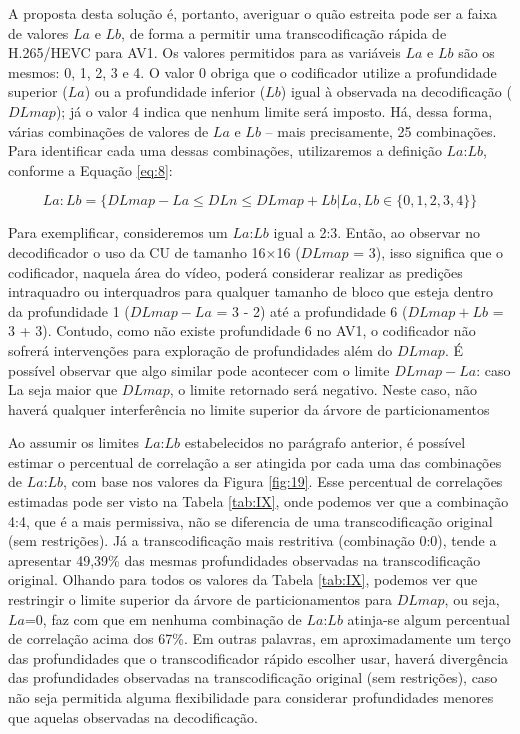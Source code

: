 A proposta desta solução é, portanto, averiguar o quão estreita pode ser a faixa de valores $La$ e $Lb$, de forma a permitir uma transcodificação rápida de H.265/HEVC para AV1. Os valores permitidos para as variáveis $La$ e $Lb$ são os mesmos: 0, 1, 2, 3 e 4. O valor 0 obriga que o codificador utilize a profundidade superior ($La$) ou a profundidade inferior ($Lb$) igual à observada na decodificação ($DLmap$); já o valor 4 indica que nenhum limite será imposto. Há, dessa forma, várias combinações de valores de $La$ e $Lb$ – mais precisamente, 25 combinações. Para identificar cada uma dessas combinações, utilizaremos a definição $La$:$Lb$, conforme a Equação \ref{eq:8}:

\begin{equation}
    \label{eq:8}
    La:Lb = \{ DLmap - La \leq DLn \leq DLmap + Lb | La, Lb \in \{ 0, 1, 2, 3, 4 \} \}
\end{equation}

Para exemplificar, consideremos um $La$:$Lb$ igual a 2:3. Então, ao observar no decodificador o uso da CU de tamanho 16$\times$16 ($DLmap$ = 3), isso significa que o codificador, naquela área do vídeo, poderá considerar realizar as predições intraquadro ou interquadros para qualquer tamanho de bloco que esteja dentro da profundidade 1 ($DLmap - La$ = 3 - 2) até a profundidade 6 ($DLmap + Lb$ = 3 + 3). Contudo, como não existe profundidade 6 no AV1, o codificador não sofrerá intervenções para exploração de profundidades além do $DLmap$. É possível observar que algo similar pode acontecer com o limite $DLmap - La$: caso La seja maior que $DLmap$, o limite retornado será negativo. Neste caso, não haverá qualquer interferência no limite superior da árvore de particionamentos

Ao assumir os limites $La$:$Lb$ estabelecidos no parágrafo anterior, é possível estimar o percentual de correlação a ser atingida por cada uma das combinações de $La$:$Lb$, com base nos valores da Figura \ref{fig:19}. Esse percentual de correlações estimadas pode ser visto na Tabela \ref{tab:IX}, onde podemos ver que a combinação 4:4, que é a mais permissiva, não se diferencia de uma transcodificação original (sem restrições). Já a transcodificação mais restritiva (combinação 0:0), tende a apresentar 49,39\% das mesmas profundidades observadas na transcodificação original. Olhando para todos os valores da Tabela \ref{tab:IX}, podemos ver que restringir o limite superior da árvore de particionamentos para $DLmap$, ou seja, $La$=0, faz com que em nenhuma combinação de $La$:$Lb$ atinja-se algum percentual de correlação acima dos 67\%. Em outras palavras, em aproximadamente um terço das profundidades que o transcodificador rápido escolher usar, haverá divergência das profundidades observadas na transcodificação original (sem restrições), caso não seja permitida alguma flexibilidade para considerar profundidades menores que aquelas observadas na decodificação.

